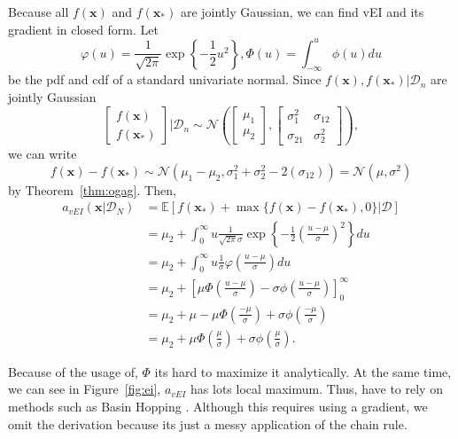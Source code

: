 Because all $f(\mathbf{x})$ and $f(\mathbf{x}_*)$ are jointly Gaussian, we can find vEI and its gradient in closed form.
Let
\begin{equation*}
    \varphi(u) = \frac{ 1 }{ \sqrt{ 2 \pi } } \exp \left\{ -\frac12 u^2 \right\},
    \Phi(u) = \int_{-\infty}^{u} \phi(u) du
\end{equation*}
be the pdf and cdf of a standard univariate normal.
Since $f(\mathbf{x}), f(\mathbf{x}_*) | \mathcal{D}_n$ are jointly Gaussian
\begin{equation*}
    \begin{bmatrix}
        f(\mathbf{x}) \\
        f(\mathbf{x}_*)
    \end{bmatrix}
    | \mathcal{D}_n
    \sim \mathcal{N}\left(
    \begin{bmatrix}
            \mu_1 \\
            \mu_2
        \end{bmatrix}
    ,
    \begin{bmatrix}
            \sigma_{1}^2 & \sigma_{12} \\
            \sigma_{21} & \sigma^2_2
        \end{bmatrix}
    \right),
\end{equation*}
we can write
\begin{equation*}
    f(\mathbf{x}) - f(\mathbf{x}_*) \sim \mathcal{N}(\mu_1 - \mu_2, \sigma_1^2 + \sigma_2^2 - 2(\sigma_{12}))
    = \mathcal{N}(\mu, \sigma^2)
\end{equation*}
by Theorem~\ref{thm:ogag}.
Then,
\begin{align*}
    a_{vEI}(\mathbf{x} | \mathcal{D}_N)
    & =  \mathbb{E}[f(\mathbf{x}_*) + \max \{  f(\mathbf{x}) - f(\mathbf{x}_*), 0 \} | \mathcal{D}] \\
    & = \mu_2 + \int_{0}^\infty u \frac{ 1 }{ \sqrt{2 \pi } \sigma} \exp \left\{ -\frac12 \left(\frac{ u - \mu }{ \sigma }\right)^2 \right\} du \\
    & = \mu_2 + \int_{0}^\infty u \frac{ 1 }{ \sigma } \varphi\left(\frac{ u - \mu }{ \sigma }\right) du \\
    & = \mu_2 + \left[ \mu \Phi\left(\frac{ u - \mu }{ \sigma }\right) - \sigma \phi\left(\frac{ u - \mu }{ \sigma }\right)\right]_{0}^{\infty} \\
    & = \mu_2 +  \mu - \mu \Phi\left(\frac{ -\mu }{ \sigma }\right) + \sigma \phi\left(\frac{ -\mu }{ \sigma }\right) \\
    & = \mu_2 + \mu \Phi\left(\frac{ \mu }{ \sigma }\right) + \sigma \phi\left(\frac{ \mu }{ \sigma }\right).
\end{align*}

Because of the usage of, $\Phi$ its hard to maximize it analytically.
At the same time, we can see in Figure~\ref{fig:ei}, $a_{vEI}$ has lots local maximum.
Thus, have to rely on methods such as Basin Hopping \cite{wales1997}.
Although this requires using a gradient, we omit the derivation because its just a messy application of the chain rule.


